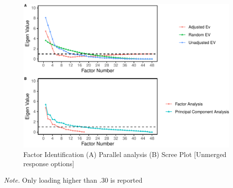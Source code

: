 \documentclass[
  english,
  man]{apa6}
\begin{document}
\begin{appendix}
\begin{center}
\begin{ThreePartTable}
\end{ThreePartTable}
\end{center}

\begin{figure}
\centering
\includegraphics{manuscript_files/figure-latex/facIdFigAppB-1.pdf}
\caption{\label{fig:facIdFigAppB}Factor Identification (A) Parallel analysis
(B) Scree Plot {[}Unmerged response options{]}}
\end{figure}

\begin{center}
\begin{ThreePartTable}

\begin{TableNotes}[para]
\normalsize{\textit{Note.} Only loading higher than .30 is reported}
\end{TableNotes}


\end{ThreePartTable}
\end{center}
\end{appendix}
\end{document}
